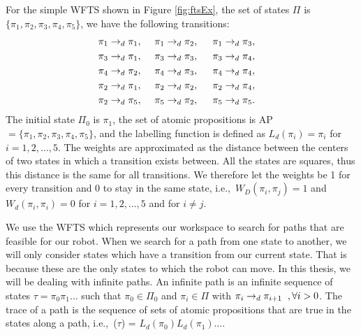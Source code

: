 For the simple WFTS shown in Figure \ref{fig:ftsEx}, the set of states $\Pi $ is $ \{\pi_1, \pi_2, \pi_3, \pi_4, \pi_5 \}$, we have the following transitions: 
\begin{align*}
\pi_1 \rightarrow_d \pi_1, \hspace{.5cm} & \pi_1 \rightarrow_d \pi_2, \hspace{.5cm}  \pi_1 \rightarrow_d \pi_3, &\\
\pi_3 \rightarrow_d \pi_1, \hspace{.5cm} & \pi_3 \rightarrow_d \pi_3, \hspace{.5cm}  \pi_3 \rightarrow_d \pi_4, &\\
\pi_4 \rightarrow_d \pi_2, \hspace{.5cm} & \pi_4 \rightarrow_d \pi_3, \hspace{.5cm}  \pi_4 \rightarrow_d \pi_4, &\\
\pi_2 \rightarrow_d \pi_1, \hspace{.5cm} & \pi_2 \rightarrow_d \pi_2, \hspace{.5cm}  \pi_2 \rightarrow_d \pi_4, &\\
\pi_2 \rightarrow_d \pi_5, \hspace{.5cm} & \pi_5 \rightarrow_d \pi_2, \hspace{.5cm}  \pi_5 \rightarrow_d \pi_5. &
\end{align*}
The initial state $\Pi_0$  is $\pi_1$, the set of atomic propositions is AP $=\{\pi_1,\pi_2,\pi_3,\pi_4,\pi_5\}$, and the labelling function is defined as $L_d(\pi_i) = \pi_i$ for $i=1,2,\dots,5$. The weights are approximated as the distance between the centers of two states in which a transition exists between. All the states are squares, thus this distance is the same for all transitions. We therefore let the weights be 1 for every transition and 0 to stay in the same state, i.e.,\ $W_D(\pi_i, \pi_j) = 1$ and $W_d(\pi_i,\pi_i)=0$ for $i=1,2,\dots,5$ and for $i \neq j$.


We use the WFTS which represents our workspace to search for paths that are feasible for our robot. When we search for a path from one state to another, we will only consider states which have a transition from our current state. That is because these are the only states to which the robot can move. In this thesis, we will be dealing with infinite paths. An infinite path is an infinite sequence of states $\tau = \pi_0 \pi_1 \dots$ such that $\pi_0 \in \Pi_0$ and $\pi_i \in \Pi$ with $\pi_{i} \rightarrow_d \pi_{i+1} \hspace{0.2cm}, \forall i > 0$. The trace of a path is the sequence of sets of atomic propositions that are true in the states along a path, i.e.,\ \trace($\tau$) = $L_d(\pi_0) L_d(\pi_1) \dots$.   


